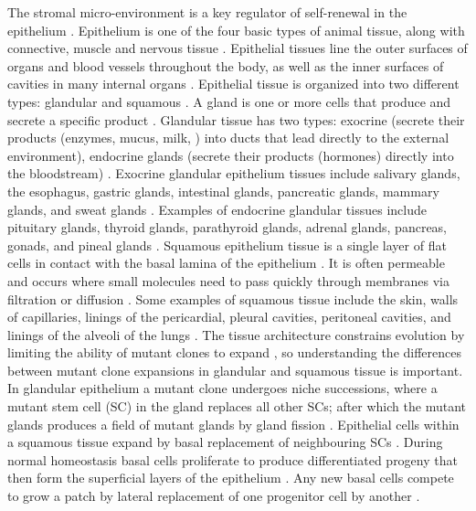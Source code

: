 \documentclass[\main/thesis.tex]{subfiles}
\begin{document}
The stromal micro-environment is a key regulator of self-renewal in the epithelium \parencite{Davis}. Epithelium is one of the four basic types of animal tissue, along with connective, muscle and nervous tissue \cite{clevelandclinic.org}. Epithelial tissues line the outer surfaces of organs and blood vessels throughout the body, as well as the inner surfaces of cavities in many internal organs \cite{clevelandclinic.org}. Epithelial tissue is organized into two different types: glandular and squamous \cite{clevelandclinic.org}. A gland is one or more cells that produce and secrete a specific product \cite{clevelandclinic.org}. Glandular tissue has two types: exocrine (secrete their products (enzymes, mucus, milk, \etc) into ducts that lead directly to the external environment), endocrine glands (secrete their products (hormones) directly into the bloodstream) \cite{leeds.ac.uk}. Exocrine glandular epithelium tissues include salivary glands, the esophagus, gastric glands, intestinal glands, pancreatic glands, mammary glands, and sweat glands \cite{leeds.ac.uk}. Examples of endocrine glandular tissues include pituitary glands, thyroid glands, parathyroid glands, adrenal glands, pancreas, gonads, and pineal glands \cite{leeds.ac.uk}. Squamous epithelium tissue is a single layer of flat cells in contact with the basal lamina of the epithelium \cite{biologyonline.com}. It is often permeable and occurs where small molecules need to pass quickly through membranes via filtration or diffusion \cite{biologyonline.com}. Some examples of squamous tissue include the skin, walls of capillaries, linings of the pericardial, pleural cavities, peritoneal cavities, and linings of the alveoli of the lungs \cite{biologyonline.com}. The tissue architecture constrains evolution by limiting the ability of mutant clones to expand \parencite{Martens}, so understanding the differences between mutant clone expansions in glandular and squamous tissue is important. In glandular epithelium a mutant clone undergoes niche successions, where a mutant stem cell (SC) in the gland replaces all other SCs; after which the mutant glands produces a field of mutant glands by gland fission \parencite{Baker,LGreaves,McDonald,Nicholson}. Epithelial cells within a squamous tissue expand by basal replacement of neighbouring SCs \parencite{Klein,Alcolea,Clayton,Doupe}. During normal homeostasis basal cells proliferate to produce differentiated progeny that then form the superficial layers of the epithelium \parencite{Teixeira}. Any new basal cells compete to grow a patch by lateral replacement of one progenitor cell by another \parencite{Teixeira}. 
\end{document}
